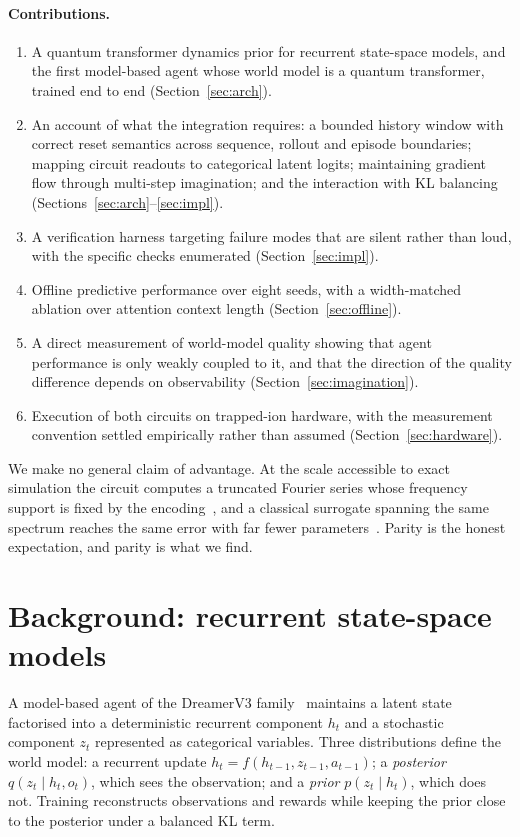 \documentclass[11pt]{article}
\begin{document}
\paragraph{Contributions.}
\begin{enumerate}\itemsep2pt
\item A quantum transformer dynamics prior for recurrent state-space
      models, and the first model-based agent whose world model is a
      quantum transformer, trained end to end
      (Section~\ref{sec:arch}).
\item An account of what the integration requires: a bounded history
      window with correct reset semantics across sequence, rollout and
      episode boundaries; mapping circuit readouts to categorical latent
      logits; maintaining gradient flow through multi-step imagination;
      and the interaction with KL balancing
      (Sections~\ref{sec:arch}--\ref{sec:impl}).
\item A verification harness targeting failure modes that are silent
      rather than loud, with the specific checks enumerated
      (Section~\ref{sec:impl}).
\item Offline predictive performance over eight seeds, with a
      width-matched ablation over attention context length
      (Section~\ref{sec:offline}).
\item A direct measurement of world-model quality showing that agent
      performance is only weakly coupled to it, and that the direction of
      the quality difference depends on observability
      (Section~\ref{sec:imagination}).
\item Execution of both circuits on trapped-ion hardware, with the
      measurement convention settled empirically rather than assumed
      (Section~\ref{sec:hardware}).
\end{enumerate}

We make no general claim of advantage. At the scale accessible to exact
simulation the circuit computes a truncated Fourier series whose
frequency support is fixed by the encoding~\cite{schuld2021}, and a
classical surrogate spanning the same spectrum reaches the same error
with far fewer parameters~\cite{papera}. Parity is the honest
expectation, and parity is what we find.

\section{Background: recurrent state-space models}
A model-based agent of the DreamerV3 family~\cite{hafner2023} maintains
a latent state factorised into a deterministic recurrent component
$h_t$ and a stochastic component $z_t$ represented as categorical
variables. Three distributions define the world model: a recurrent
update $h_t = f(h_{t-1}, z_{t-1}, a_{t-1})$; a \emph{posterior}
$q(z_t \mid h_t, o_t)$, which sees the observation; and a \emph{prior}
$p(z_t \mid h_t)$, which does not. Training reconstructs observations
and rewards while keeping the prior close to the posterior under a
balanced KL term.
\end{document}

